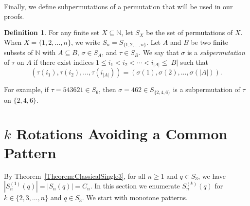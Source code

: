 \documentclass[11pt]{article}
\theoremstyle{definition}
\newtheorem{definition}[theorem]{Definition}
\numberwithin{equation}{section}
\begin{document}
Finally, we define subpermutations of a permutation that will be used in our proofs.

\begin{definition}
For any finite set $X\subseteq\mathbb{N}$, let $S_X$ be the set of permutations of $X$. When $X=\{1,2,\ldots,n\}$, we write $S_n=S_{\{1,2,\ldots,n\}}$. Let $A$ and $B$ be two finite subsets of $\mathbb{N}$ with $A\subseteq B$, $\sigma\in S_A$, and $\tau\in S_B$. We say that $\sigma$ is a 
{\em subpermutation} of $\tau$ on $A$ if 
there exist indices $1 \leq i_1<i_2<\cdots<i_{|A|} \leq |B|$ such that
    \[
    (\tau(i_1),\tau(i_2),\ldots,\tau(i_{|A|}))=(\sigma(1),\sigma(2),\ldots,\sigma(|A|)).
    \]
\end{definition}
For example, if  $\tau=543621\in S_6$, 
then $\sigma=462\in S_{\{2,4,6\}}$ is a subpermutation of $\tau$ on $\{2,4,6\}$.

\section{$k$ Rotations Avoiding a Common Pattern}\label{Section:SinglePattern3}
By Theorem~\ref{Theorem:ClassicalSingle3}, for all $n\geq1$ and $q\in S_3$, we have $|S_n^{(1)}(q)|=|S_n(q)|=C_n$. In this section we enumerate $S_n^{(k)}(q)$ for $k\in\{2,3,\ldots,n\}$ and $q\in S_3$. We start with monotone patterns.
\end{document}
